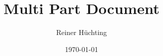 \documentclass{beamer}
\title{Multi Part Document}
\author{Reiner Hüchting}
\date{\today}
\begin{document}
\begin{frame}
\maketitle
\end{frame}

\end{document}
